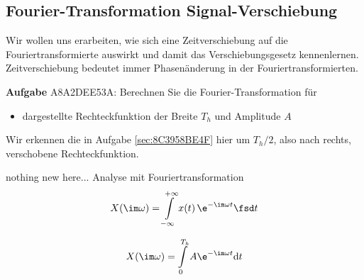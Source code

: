 \subsection{Fourier-Transformation Signal-Verschiebung}
\label{sec:A8A2DEE53A}
\begin{Ziel}
Wir wollen uns erarbeiten, wie sich eine Zeitverschiebung auf die
Fouriertransformierte auswirkt und damit das Verschiebungsgesetz kennenlernen.
Zeitverschiebung bedeutet immer Phasenänderung in der Fouriertransformierten.
\end{Ziel}
\textbf{Aufgabe} {\tiny A8A2DEE53A}: Berechnen Sie die Fourier-Transformation für
\begin{itemize}
\item dargestellte Rechteckfunktion der Breite $T_h$ und Amplitude $A$
\end{itemize}
%
\begin{figure}[h!]
\centering
{}
\end{figure}
%
Wir erkennen die in Aufgabe \ref{sec:8C3958BE4F} hier um $T_h/2$, also nach rechts,
verschobene Rechteckfunktion.


\begin{Werkzeug}
nothing new here...
Analyse mit Fouriertransformation
\begin{align}
X(\im \omega) = \int\limits_{-\infty}^{+\infty} x(t) \, \e^{-\im \omega t} \fsd t
\end{align}
\end{Werkzeug}
\begin{Ansatz}
\begin{equation}
X(\im \omega) = \int\limits_{0}^{T_h} A \e^{-\im \omega t} \mathrm{d}t
\end{equation}
\end{Ansatz}


